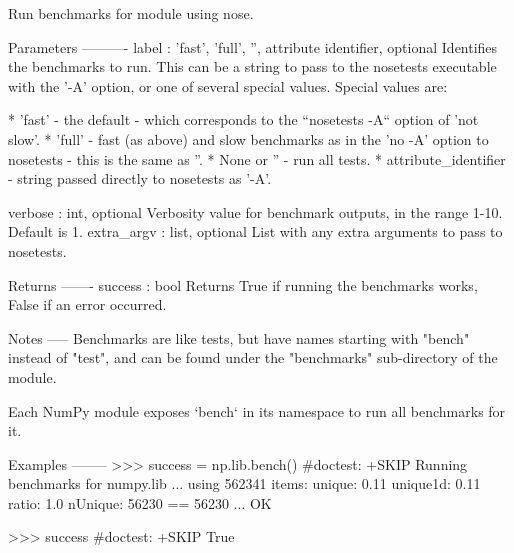 \begin{DoxyVerb}Run benchmarks for module using nose.

Parameters
----------
label : {'fast', 'full', '', attribute identifier}, optional
    Identifies the benchmarks to run. This can be a string to pass to
    the nosetests executable with the '-A' option, or one of several
    special values.  Special values are:

    * 'fast' - the default - which corresponds to the ``nosetests -A``
      option of 'not slow'.
    * 'full' - fast (as above) and slow benchmarks as in the
      'no -A' option to nosetests - this is the same as ''.
    * None or '' - run all tests.
    * attribute_identifier - string passed directly to nosetests as '-A'.

verbose : int, optional
    Verbosity value for benchmark outputs, in the range 1-10. Default is 1.
extra_argv : list, optional
    List with any extra arguments to pass to nosetests.

Returns
-------
success : bool
    Returns True if running the benchmarks works, False if an error
    occurred.

Notes
-----
Benchmarks are like tests, but have names starting with "bench" instead
of "test", and can be found under the "benchmarks" sub-directory of the
module.

Each NumPy module exposes `bench` in its namespace to run all benchmarks
for it.

Examples
--------
>>> success = np.lib.bench() #doctest: +SKIP
Running benchmarks for numpy.lib
...
using 562341 items:
unique:
0.11
unique1d:
0.11
ratio: 1.0
nUnique: 56230 == 56230
...
OK

>>> success #doctest: +SKIP
True\end{DoxyVerb}
 \mbox{\label{classnumpy_1_1testing_1_1__private_1_1nosetester_1_1NoseTester_a67f7e5d6b71983e95608039238e28f8d}} 
